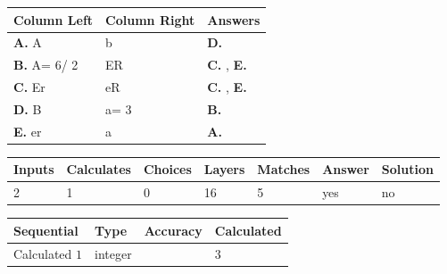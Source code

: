 \documentclass[12pt]{article}
\begin{document}
  
 
 
\noindent{}
  
  
\begin{tabular}{|l|l|l|}
 \hline
 Column Left & Column Right  & Answers       \\ 
 \hline
{\textbf{\large{
A.}}}
A
  & 
b
 & 
{\textbf{\large{
D.}}}
 \\ 
 \hline
{\textbf{\large{
B.}}}
 A= %
6/ %
2

  & 
ER
 & 
{\textbf{\large{
C.}}}
, 
{\textbf{\large{
E.}}}
 \\ 
 \hline
{\textbf{\large{
C.}}}
Er
  & 
eR
 & 
{\textbf{\large{
C.}}}
, 
{\textbf{\large{
E.}}}
 \\ 
 \hline
{\textbf{\large{
D.}}}
B
  & 
 a= %
3
 & 
{\textbf{\large{
B.}}}
 \\ 
 \hline
{\textbf{\large{
E.}}}
er
  & 
a
 & 
{\textbf{\large{
A.}}}
 \\ 
 \hline
 \end{tabular}
  
  
 
 
\noindent{}
 
 
 
   
   
   
   
\noindent\begin{tabular}{|l|l|l|l|l|l|l|}
 \hline
Inputs & Calculates & Choices & Layers & Matches & Answer & Solution \\ \hline
           2  & 
           1  & 
           0
  & 
          16  & 
           5  & 
  yes & 
  no 
  \\ \hline
 \end{tabular}
   
   
   
   
\noindent{}
   
   
  
  
\noindent\begin{tabular}{|l|l|l|l|}
\hline
 Sequential & Type & Accuracy & Calculated \\ 
\hline
 
 
  Calculated $            1 $ & integer &  & 
  $ 3 $ 
 \\  \hline  
 \end{tabular}
   
\end{document}
